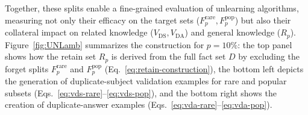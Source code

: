 

Together, these splits enable a fine-grained evaluation of unlearning algorithms, measuring not only their efficacy on the target sets ($F_p^{\text{rare}}, F_p^{\text{pop}}$) but also their collateral impact on related knowledge ($V_{\text{DS}}, V_{\text{DA}}$) and general knowledge ($R_p$). Figure~\ref{fig:UNLamb} summarizes the construction for \(p=10\%\): the top panel shows how the retain set \(R_p\) is derived from the full fact set \(D\) by excluding the forget splits \(F_p^{\text{rare}}\) and \(F_p^{\text{pop}}\) (Eq.~\eqref{eq:retain-construction}), the bottom left depicts the generation of duplicate-subject validation examples for rare and popular subsets (Eqs.~\eqref{eq:vds-rare}--\eqref{eq:vds-pop}), and the bottom right shows the creation of duplicate-answer examples (Eqs.~\eqref{eq:vda-rare}--\eqref{eq:vda-pop}).





